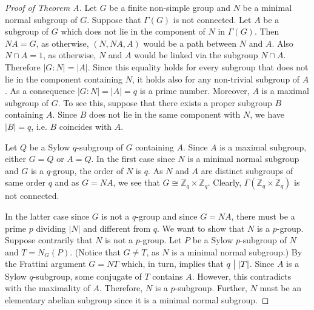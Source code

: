 \documentclass[a4paper,12pt]{article}
\theoremstyle{definition}
\theoremstyle{remark}
\theoremstyle{theorem}
\newcommand{\divides}{\bigm|}
\begin{document}
\begin{proof}[Proof of Theorem A]
Let $G$ be a finite non-simple group and $N$ be a minimal normal subgroup of $G$. Suppose that $\Gamma(G)$ is not connected. Let $A$ be a subgroup of $G$ which does not lie in the component of $N$ in $\Gamma(G)$. Then $NA=G$, as otherwise, $(N,NA,A)$ would be a path between $N$ and $A$. Also $N\cap A=1$, as otherwise, $N$ and $A$ would be linked via the subgroup $N\cap A$. Therefore $|G:N|=|A|$. Since this equality holds for every subgroup that does not lie in the component containing $N$, it holds also for any non-trivial subgroup of $A$. As a consequence $|G:N|=|A|=q$ is a prime number. Moreover, $A$ is a maximal subgroup of $G$. To see this, suppose that there exists a proper subgroup $B$ containing $A$. Since $B$ does not lie in the same component with $N$, we have $|B|=q$, i.e. $B$ coincides with $A$.

Let $Q$ be a Sylow $q$-subgroup of $G$ containing $A$. Since $A$ is a maximal subgroup, either $G=Q$ or $A=Q$. In the first case since $N$ is a minimal normal subgroup and $G$ is a $q$-group, the order of $N$ is $q$. As $N$ and $A$ are distinct subgroups of same order $q$ and as $G=NA$, we see that $G\cong \mathbb{Z}_q\times\mathbb{Z}_q$. Clearly, $\Gamma(\mathbb{Z}_q\times\mathbb{Z}_q)$ is not connected.


In the latter case since $G$ is not a $q$-group and since $G=NA$, there must be a prime $p$ dividing $|N|$ and different from $q$. We want to show that $N$ is a $p$-group. Suppose contrarily that $N$ is not a $p$-group. Let $P$ be a Sylow $p$-subgroup of $N$ and $T=N_G(P)$. (Notice that $G\neq T$, as $N$ is a minimal normal subgroup.) By the Frattini argument $G=NT$ which, in turn, implies that $q\divides |T|$. Since $A$ is a Sylow $q$-subgroup, some conjugate of $T$ contains $A$. However, this contradicts with the maximality of $A$. Therefore, $N$ is a $p$-subgroup. Further, $N$ must be an elementary abelian subgroup since it is a minimal normal subgroup.



\end{proof}
\end{document}

